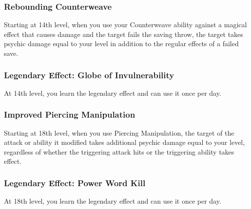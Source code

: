 \subsubsection{Rebounding Counterweave}
Starting at 14th level, when you use your Counterweave ability against a magical effect that causes damage and the target fails the saving throw, the target takes psychic damage equal to your level in addition to the regular effects of a failed save.

\subsubsection{Legendary Effect: Globe of Invulnerability}
At 14th level, you learn the legendary effect  and can use it once per day.

\subsubsection{Improved Piercing Manipulation}
Starting at 18th level, when you use Piercing Manipulation, the target of the attack or ability it modified takes additional psychic damage equal to your level, regardless of whether the triggering attack hits or the triggering ability takes effect.

\subsubsection{Legendary Effect: Power Word Kill}
At 18th level, you learn the legendary effect  and can use it once per day.

